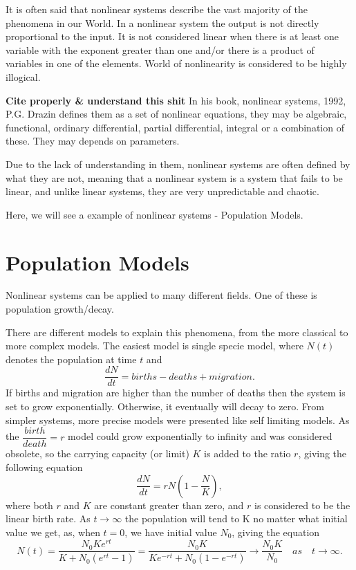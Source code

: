 \documentclass[a4paper]{report}
\theoremstyle{definition}
\begin{document}
It is often said that nonlinear systems describe the vast majority of the phenomena in our World. In a nonlinear system the output is not directly proportional to the input. It is not considered linear when there is at least one variable with the exponent greater than one and/or there is a product of variables in one of the elements. World of nonlinearity is considered to be highly illogical.

\textbf{Cite properly \& understand this shit}
In his book, nonlinear systems, 1992, P.G. Drazin defines them as a set of nonlinear equations, they may be algebraic, functional, ordinary differential, partial differential, integral or a combination of these. They may depends on parameters.

Due to the lack of understanding in them, nonlinear systems are often defined by what they are not, meaning that a nonlinear system is a system that fails to be linear, and unlike linear systems, they are very unpredictable and chaotic.

Here, we will see a example of nonlinear systems - Population Models.
\section{Population Models}
Nonlinear systems can be applied to many different fields. One of these is population growth/decay.

There are different models to explain this phenomena, from the more classical to more complex models.
The easiest model is single specie model, where $N(t)$ denotes the population at time $t$ and
\begin{equation}
\frac{dN}{dt}=births-deaths+migration.
\end{equation} 
If births and migration are higher than the number of deaths then the system is set to grow exponentially. Otherwise, it eventually will decay to  zero.
From simpler systems, more precise models were presented like self limiting models. As the $\dfrac{birth}{death}=r$ model could grow exponentially to infinity and was considered obsolete, so the carrying capacity (or limit) $K$ is added to the ratio $r$, giving the following equation
\begin{equation}
\frac{dN}{dt}=rN\left(1-\frac{N}{K}\right),
\end{equation}
where both $r$ and $K$ are constant greater than zero, and $r$ is considered to be the linear birth rate.
As $t\rightarrow \infty$ the population will tend to K no matter what initial value we get, as, when $t=0$, we have initial value $N_0$, giving the equation
\begin{equation}
N(t)=\frac{N_0Ke^{rt}}{K+N_0(e^{rt}-1)}=\frac{N_0K}{Ke^{-rt}+N_0(1-e^{-rt})}\rightarrow \frac{N_0K}{N_0}\quad as \quad t\rightarrow\infty.
\label{eq:lg50}
\end{equation}
\end{document}
